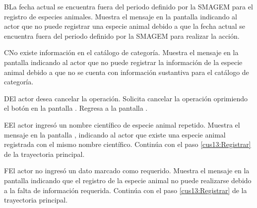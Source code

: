    \begin{UCtrayectoriaA}{B}{La fecha actual se encuentra fuera del periodo definido por la SMAGEM para el registro de especies animales.}
    \UCpaso[\UCsist] Muestra el mensaje  en la pantalla  indicando al actor que no puede registrar una especie animal debido a que la fecha actual se encuentra fuera del periodo definido por la SMAGEM para realizar la acción. 
 \end{UCtrayectoriaA}
 
 \begin{UCtrayectoriaA}{C}{No existe información en el catálogo de categoría.}
    \UCpaso[\UCsist] Muestra el mensaje  en la pantalla  indicando al actor que no puede registrar la información de la especie animal debido a que no se cuenta con información sustantiva para el catálogo de categoría.
 \end{UCtrayectoriaA}
 
    \begin{UCtrayectoriaA}{D}{El actor desea cancelar la operación.}
    \UCpaso[\UCactor] Solicita cancelar la operación oprimiendo el botón  en la pantalla .
    \UCpaso[\UCsist] Regresa a la pantalla . 
    \end{UCtrayectoriaA}
  
   \begin{UCtrayectoriaA}{E}{El actor ingresó un nombre científico de especie animal repetido.}
    \UCpaso[\UCsist] Muestra el mensaje  en la pantalla , indicando al actor que existe una especie animal registrada con el mismo nombre científico.
    \UCpaso[] Continúa con el paso \ref{cus13:Registrar} de la trayectoria principal.
 \end{UCtrayectoriaA}
 
    \begin{UCtrayectoriaA}{F}{El actor no ingresó un dato marcado como requerido.}    
    \UCpaso[\UCsist] Muestra el mensaje  en la pantalla  indicando que el registro de la especie animal no puede realizarse debido a la falta de información requerida.
    \UCpaso[] Continúa con el paso \ref{cus13:Registrar} de la trayectoria principal.     
    \end{UCtrayectoriaA}
 
